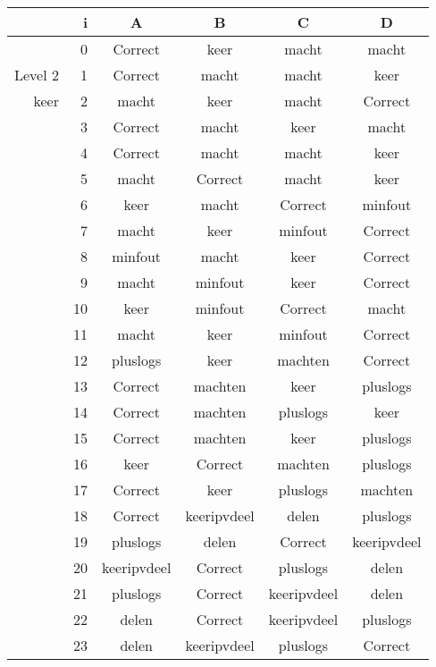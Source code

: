 \begin{tabular}{ rr| c|c|c|c}\hline\hline
     & i & \textbf{A} & \textbf{B} & \textbf{C} & \textbf{D}\\\hline

&0&Correct\cellcolor[gray]{0.6}&keer&macht&macht\\
Level 2 & 1&Correct\cellcolor[gray]{0.6}&macht&macht&keer\\
keer &2&macht&keer&macht&Correct\cellcolor[gray]{0.6}\\
&3&Correct\cellcolor[gray]{0.6}&macht&keer&macht\\
&4&Correct\cellcolor[gray]{0.6}&macht&macht&keer\\
&5&macht&Correct\cellcolor[gray]{0.6}&macht&keer\\
&6&keer&macht&Correct\cellcolor[gray]{0.6}&minfout\\
&7&macht&keer&minfout&Correct\cellcolor[gray]{0.6}\\
&8&minfout&macht&keer&Correct\cellcolor[gray]{0.6}\\
&9&macht&minfout&keer&Correct\cellcolor[gray]{0.6}\\
&10&keer&minfout&Correct\cellcolor[gray]{0.6}&macht\\
&11&macht&keer&minfout&Correct\cellcolor[gray]{0.6}\\
&12&pluslogs&keer&machten&Correct\cellcolor[gray]{0.6}\\
&13&Correct\cellcolor[gray]{0.6}&machten&keer&pluslogs\\
&14&Correct\cellcolor[gray]{0.6}&machten&pluslogs&keer\\
&15&Correct\cellcolor[gray]{0.6}&machten&keer&pluslogs\\
&16&keer&Correct\cellcolor[gray]{0.6}&machten&pluslogs\\
&17&Correct\cellcolor[gray]{0.6}&keer&pluslogs&machten\\
&18&Correct\cellcolor[gray]{0.6}&keeripvdeel&delen&pluslogs\\
&19&pluslogs&delen&Correct\cellcolor[gray]{0.6}&keeripvdeel\\
&20&keeripvdeel&Correct\cellcolor[gray]{0.6}&pluslogs&delen\\
&21&pluslogs&Correct\cellcolor[gray]{0.6}&keeripvdeel&delen\\
&22&delen&Correct\cellcolor[gray]{0.6}&keeripvdeel&pluslogs\\
&23&delen&keeripvdeel&pluslogs&Correct\cellcolor[gray]{0.6}\\
\hline\end{tabular}\par\ \newline

